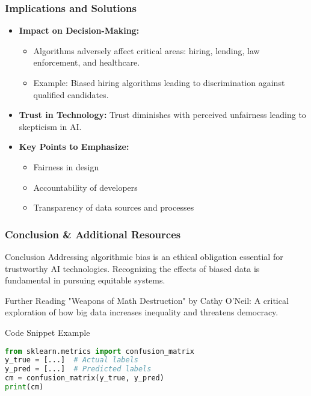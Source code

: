\documentclass{beamer}
\begin{document}
\begin{frame}[fragile]
    \frametitle{Implications and Solutions}
    \begin{itemize}
        \item \textbf{Impact on Decision-Making:}
        \begin{itemize}
            \item Algorithms adversely affect critical areas: hiring, lending, law enforcement, and healthcare.
            \item Example: Biased hiring algorithms leading to discrimination against qualified candidates.
        \end{itemize}

        \item \textbf{Trust in Technology:} Trust diminishes with perceived unfairness leading to skepticism in AI.
        
        \item \textbf{Key Points to Emphasize:}
        \begin{itemize}
            \item Fairness in design
            \item Accountability of developers
            \item Transparency of data sources and processes
        \end{itemize}
    \end{itemize}
\end{frame}

\begin{frame}[fragile]
    \frametitle{Conclusion & Additional Resources}
    \begin{block}{Conclusion}
        Addressing algorithmic bias is an ethical obligation essential for trustworthy AI technologies. Recognizing the effects of biased data is fundamental in pursuing equitable systems.
    \end{block}

    \begin{block}{Further Reading}
        "Weapons of Math Destruction" by Cathy O'Neil: A critical exploration of how big data increases inequality and threatens democracy.
    \end{block}
    
    \begin{block}{Code Snippet Example}
    \begin{lstlisting}[language=Python]
from sklearn.metrics import confusion_matrix
y_true = [...]  # Actual labels
y_pred = [...]  # Predicted labels
cm = confusion_matrix(y_true, y_pred)
print(cm)
    \end{lstlisting}
    \end{block}
\end{frame}
\end{document}
